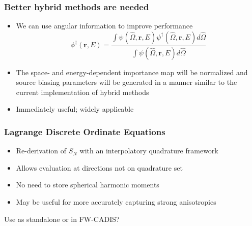 \documentclass[xcolor=x11names,compress]{beamer}
\renewcommand{\(}{\begin{columns}}
\renewcommand{\)}{\end{columns}}
\newcommand{\<}[1]{\begin{column}{#1}}
\renewcommand{\>}{\end{column}}
\newcommand{\vOmega}{\ensuremath{\hat{\Omega}}}
\newcommand{\ve}[1]{\ensuremath{\mathbf{#1}}}
\begin{document}
\begin{frame}[fragile]
  \frametitle{Better hybrid methods are needed}

	\begin{itemize}
	\item We can use angular information to improve performance
		\begin{equation}
		\phi^{\dagger}(\ve{r},E) = \frac{\int \psi(\vOmega, \ve{r},E) \psi^{\dagger}(\vOmega, \ve{r},E) d\vOmega}{\int \psi(\vOmega, \ve{r},E)  d\vOmega}
		\end{equation}

	\item The space- and energy-dependent importance map will be normalized and source biasing parameters will be generated in a manner similar to the current implementation of hybrid methods
	\item Immediately useful; widely applicable
	\end{itemize}

\end{frame}


\begin{frame}[fragile]
  \frametitle{Lagrange Discrete Ordinate Equations}

	\begin{itemize}
	\item Re-derivation of $S_N$ with an interpolatory quadrature framework
	\item Allows evaluation at directions not on quadrature set
	\item No need to store spherical harmonic moments
	\item May be useful for more accurately capturing strong anisotropies
	\end{itemize}
	
	Use as standalone or in FW-CADIS?

\end{frame}

\end{document}
